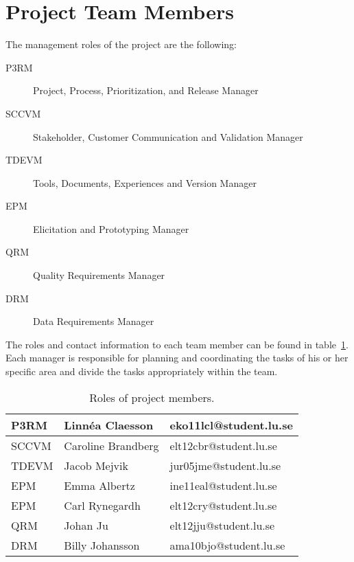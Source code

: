 \documentclass[10pt,a4paper]{article}
\begin{document}
\section{Project Team Members}
The management roles of the project are the following:

\begin{description}
\item[P3RM] Project, Process, Prioritization, and Release Manager
\item[SCCVM] Stakeholder, Customer Communication and Validation Manager
\item[TDEVM] Tools, Documents, Experiences and Version Manager 
\item[EPM] Elicitation and Prototyping Manager
\item[QRM] Quality Requirements Manager
\item[DRM] Data Requirements Manager
\end{description}

The roles and contact information to each team member can be found in table~\ref{table:roles}. Each manager is responsible for planning and coordinating the tasks of his or her specific area and divide the tasks appropriately within the team.

\begin{table}[h!]
\centering
\caption{Roles of project members.}
\label{table:roles}
\begin{tabular}{|l|l|l|} \hline
P3RM & Linnéa Claesson & eko11lcl@student.lu.se\\ \hline
SCCVM & Caroline Brandberg & elt12cbr@student.lu.se\\ \hline
TDEVM & Jacob Mejvik & jur05jme@student.lu.se\\ \hline
EPM & Emma Albertz & ine11eal@student.lu.se\\ \hline
EPM & Carl Rynegardh & elt12cry@student.lu.se\\ \hline
QRM & Johan Ju & elt12jju@student.lu.se\\ \hline
DRM & Billy Johansson & ama10bjo@student.lu.se\\ \hline

\end{tabular}\\
\end{table}
\end{document}
